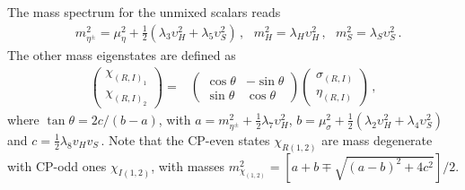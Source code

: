 \documentclass[12pt]{article}
\begin{document}
The mass spectrum for the unmixed scalars reads
\begin{align*}
   & m_{\eta^{\pm}}^{2}= \mu_{\eta}^{2} + \frac{1}{2} (\lambda_{3} \upsilon^{2}_{H} + \lambda_{5} \upsilon^{2}_{S} )\,,\,\,\,\, m_{H}^{2} = \lambda_{H} \upsilon_{H}^{2}\,,\,\,\,\,    m_{S}^{2}= \lambda_{S} \upsilon_{S}^{2}\,.
\end{align*}
%
The other mass eigenstates are defined as
%
\begin{align*}
    \begin{pmatrix}\chi_{(R,I)_{1}} \\ \chi_{(R,I)_{2}} \end{pmatrix} =& \begin{pmatrix} \cos\theta & -\sin\theta \\ \sin\theta & \cos\theta \end{pmatrix} \begin{pmatrix}\sigma_{(R,I)} \\ \eta_{(R,I)} \end{pmatrix} \,,
\end{align*}
%
where $\tan\theta= 2c/(b-a)$, with $a = m^{2}_{\eta^{\pm}} + \frac{1}{2}\lambda_{7} \upsilon^{2}_{H}$, $b = \mu^{2}_{\sigma}+\frac{1}{2}(\lambda_{2} \upsilon^{2}_{H} + \lambda_{4} \upsilon^{2}_{S})$ and $c = \frac{1}{2}\lambda_8 v_{H} v_{S}$\,. Note that the CP-even  states $\chi_{R(1,2)}$ are mass degenerate with CP-odd ones $\chi_{I(1,2)}$, with masses $ m_{\chi_{(1,2)}}^{2}= [a + b \mp \sqrt{(a-b)^{2} + 4c^{2}}]/2$.   

%
%
\end{document}
